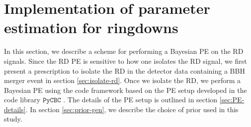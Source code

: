 


\section{Implementation of parameter estimation for ringdowns}
\label{sec:Implementation}

In this section, we describe a scheme for performing a Bayesian PE on the RD signals.  Since the RD PE is sensitive to how one isolates the RD signal, we first present a prescription to isolate the RD in the detector data containing a BBH merger event in section \ref{sec:isolate-rd}. Once we isolate the RD, we perform a Bayesian PE using the code framework based on the PE setup developed in the code library $\texttt{PyCBC}$ \cite{Canton:2014ena,Usman:2015kfa,Nitz:2017svb}. The details of the PE setup is outlined in section \ref{sec:PE-details}. In section \ref{sec:prior-gen}, we describe the choice of prior used in this study.



